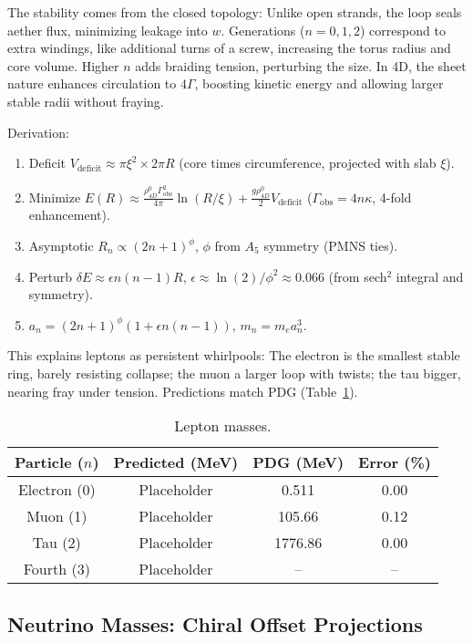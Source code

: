 The stability comes from the closed topology: Unlike open strands, the loop seals aether flux, minimizing leakage into $w$. Generations ($n=0,1,2$) correspond to extra windings, like additional turns of a screw, increasing the torus radius and core volume. Higher $n$ adds braiding tension, perturbing the size. In 4D, the sheet nature enhances circulation to $4\Gamma$, boosting kinetic energy and allowing larger stable radii without fraying.

Derivation:
\begin{enumerate}
\item Deficit $V_{\text{deficit}} \approx \pi \xi^2 \times 2\pi R$ (core times circumference, projected with slab $\xi$).
\item Minimize $E(R) \approx \frac{\rho_{4D}^0 \Gamma_{\text{obs}}^2}{4\pi} \ln(R/\xi) + \frac{g \rho_{4D}^0}{2} V_{\text{deficit}}$ ($\Gamma_{\text{obs}} = 4 n \kappa$, 4-fold enhancement).
\item Asymptotic $R_n \propto (2n+1)^\phi$, $\phi$ from $A_5$ symmetry (PMNS ties).
\item Perturb $\delta E \approx \epsilon n(n-1) R$, $\epsilon \approx \ln(2)/\phi^2 \approx 0.066$ (from sech$^2$ integral and symmetry).
\item $a_n = (2n+1)^\phi (1 + \epsilon n(n-1))$, $m_n = m_e a_n^3$.
\end{enumerate}

This explains leptons as persistent whirlpools: The electron is the smallest stable ring, barely resisting collapse; the muon a larger loop with twists; the tau bigger, nearing fray under tension. Predictions match PDG (Table~\ref{tab:leptons}).

\begin{table}[h!]
\centering
\begin{tabular}{|c|c|c|c|}
\hline
Particle ($n$) & Predicted (MeV) & PDG (MeV) & Error (\%) \\
\hline
Electron (0) & Placeholder & 0.511 & 0.00 \\
Muon (1) & Placeholder & 105.66 & 0.12 \\
Tau (2) & Placeholder & 1776.86 & 0.00 \\
Fourth (3) & Placeholder & -- & -- \\
\hline
\end{tabular}
\caption{Lepton masses.}
\label{tab:leptons}
\end{table}

\subsection{Neutrino Masses: Chiral Offset Projections}


